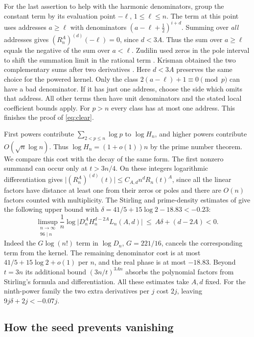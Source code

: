 \documentclass[11pt]{article}
\numberwithin{equation}{section}
\begin{document}
For the last assertion to help with the harmonic denominators, group
the constant term by its evaluation point \(-\ell\), \(1\le\ell\le n\).
The term at this point uses addresses \(a\ge\ell\) with denominators
\((a-\ell+\tfrac12)^{i+d}\). Summing over \emph{all} addresses gives
\((R_n^A)^{(d)}(-\ell)=0\), since \(d<3A\). Thus the sum over
\(a\ge\ell\) equals the negative of the sum over \(a<\ell\).
Zudilin used zeros in the pole interval to shift the summation limit
in the rational term \cite[proofs of Lemmas~1 and~5]{zudbeta}.
Krisman obtained the two complementary sums after two derivatives
\cite[Lemma~4.6]{krisman}. Here \(d<3A\) preserves the same choice
for the powered kernel.
Only the class \(2(a-\ell)+1\equiv0\pmod p\) can have a bad
denominator. If it has just one address, choose the side which omits
that address. All other terms then have unit denominators and the
stated local coefficient bounds apply. For \(p>n\) every class has at
most one address. This finishes the proof of \eqref{eq:clear}.

First powers contribute \(\sum_{2<p\le n}\log p\) to \(\log H_n\),
and higher powers contribute \(O(\sqrt n\log n)\). Thus
\(\log H_n=(1+o(1))n\) by the prime number theorem. We compare this cost with the decay of the
same form. The first nonzero summand can occur only at \(t>3n/4\).
On these integers logarithmic differentiation gives
\(\lvert(R_n^A)^{(d)}(t)\rvert\le C_{A,d}n^d R_n(t)^A\), since all the
linear factors have distance at least one from their zeros or poles
and there are \(O(n)\) factors counted with multiplicity.
The Stirling and prime-density estimates of \cite[Section 4]{fifteen}
give the following upper bound with \(\delta=41/5+15\log2-18.83<-0.23\):
\begin{equation}\label{eq:decay}
 \limsup_{\substack{n\to\infty\\96\mid n}}\frac1n
 \log\bigl|D_n^A H_n^{d-2A}L_n(A,d)\bigr|
                 \ \le\ A\delta+(d-2A)<0 .
\end{equation}
Indeed the \(G\log(n!)\) term in \(\log D_n\), \(G=221/16\),
cancels the corresponding term from the kernel. The remaining
denominator cost is at most \(41/5+15\log2+o(1)\) per \(n\), and the
real phase is at most \(-18.83\). Beyond \(t=3n\) its additional
bound \((3n/t)^{3An}\) absorbs the polynomial factors from Stirling's
formula and differentiation. All these estimates take \(A,d\) fixed.
For the ninth-power family the two extra derivatives per \(j\) cost
\(2j\), leaving \(9j\delta+2j<-0.07j\).

\subsection{How the seed prevents vanishing}
\end{document}

